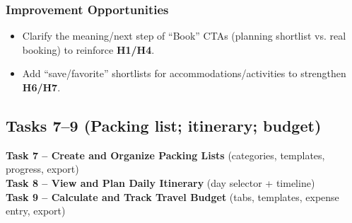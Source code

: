 \documentclass[11pt,a4paper]{article}
\begin{document}
\subsubsection{Improvement Opportunities}
\begin{itemize}
    \item Clarify the meaning/next step of ``Book'' CTAs (planning shortlist vs. real booking) to reinforce \textbf{H1/H4}.
    \item Add ``save/favorite'' shortlists for accommodations/activities to strengthen \textbf{H6/H7}.
\end{itemize}

\subsection{Tasks 7--9 (Packing list; itinerary; budget)}
\textbf{Task 7 – Create and Organize Packing Lists} (categories, templates, progress, export)\\
\textbf{Task 8 – View and Plan Daily Itinerary} (day selector + timeline)\\
\textbf{Task 9 – Calculate and Track Travel Budget} (tabs, templates, expense entry, export)
\end{document}
